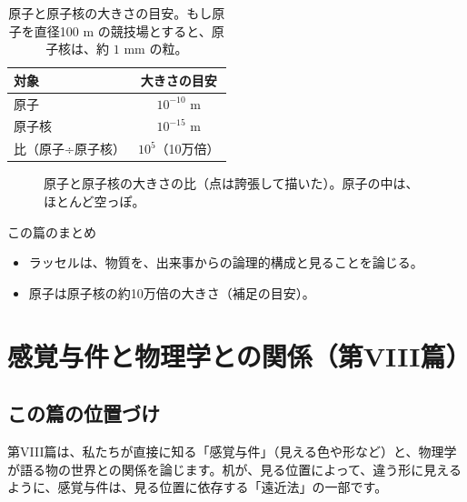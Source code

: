 \documentclass[a4paper,11pt,openany]{ltjsbook}
\begin{document}
\begin{table}[htbp]
\centering
\begin{tabular}{lc}
\toprule
対象 & 大きさの目安\\
\midrule
原子 & $10^{-10}$ m\\
原子核 & $10^{-15}$ m\\
比（原子÷原子核） & $10^{5}$（10万倍）\\
\bottomrule
\end{tabular}
\caption{原子と原子核の大きさの目安。もし原子を直径100 m の競技場とすると、原子核は、約 $1$ mm の粒。}
\end{table}

\begin{figure}[htbp]
\centering
{}
\caption{原子と原子核の大きさの比（点は誇張して描いた）。原子の中は、ほとんど空っぽ。}
\end{figure}

\begin{pointbox}{この篇のまとめ}
\begin{itemize}[leftmargin=*]
\item ラッセルは、物質を、出来事からの論理的構成と見ることを論じる。
\item 原子は原子核の約10万倍の大きさ（補足の目安）。
\end{itemize}
\end{pointbox}

\chapter{感覚与件と物理学との関係（第VIII篇）}

\section{この篇の位置づけ}

第VIII篇は、私たちが直接に知る「感覚与件」（見える色や形など）と、物理学が語る物の世界との関係を論じます。机が、見る位置によって、違う形に見えるように、感覚与件は、見る位置に依存する「遠近法」の一部です。
\end{document}
